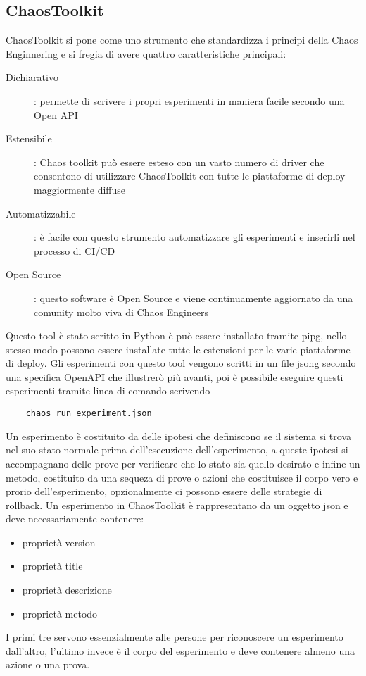 \subsection{ChaosToolkit}
ChaosToolkit si pone come uno strumento che standardizza i principi della Chaos Enginnering e si fregia di avere quattro caratteristiche principali:
\begin{description}
    \item[Dichiarativo]: permette di scrivere i propri esperimenti in maniera facile secondo una Open API
    \item[Estensibile]: Chaos toolkit può essere esteso con un vasto numero di driver che consentono di utilizzare ChaosToolkit con tutte le piattaforme di deploy maggiormente diffuse
    \item[Automatizzabile]: è facile con questo strumento automatizzare gli esperimenti e inserirli nel processo di CI/CD
    \item[Open Source]: questo software è Open Source e viene continuamente aggiornato da una comunity molto viva di Chaos Engineers
\end{description}
Questo tool è stato scritto in Python è può essere installato tramite \gls{pipg}, nello stesso modo possono essere installate tutte le estensioni per le varie piattaforme di deploy.
Gli esperimenti con questo tool vengono scritti in un file \gls{jsong} secondo una specifica OpenAPI che illustrerò più avanti, poi è possibile eseguire questi esperimenti tramite linea di comando scrivendo
\begin{verbatim}
    chaos run experiment.json
\end{verbatim}
Un esperimento è costituito da delle ipotesi che definiscono se il sistema si trova nel suo stato normale prima dell'esecuzione dell'esperimento, a queste ipotesi si accompagnano delle prove per verificare che lo stato sia quello desirato e infine un metodo, costituito da una sequeza di prove o azioni che costituisce il corpo vero e prorio dell'esperimento, opzionalmente ci possono essere delle strategie di rollback.
Un esperimento in ChaosToolkit è rappresentano da un oggetto json e deve necessariamente contenere:
\begin{itemize}
    \item proprietà version
    \item proprietà title
    \item proprietà descrizione
    \item proprietà metodo
\end{itemize}
I primi tre servono essenzialmente alle persone per riconoscere un esperimento dall'altro, l'ultimo invece è il corpo del esperimento e deve contenere almeno una azione o una prova.
